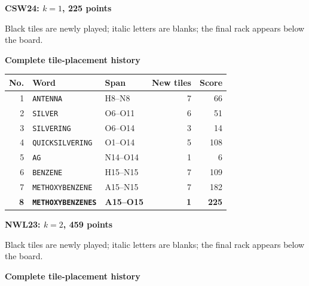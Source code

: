 \documentclass[letterpaper]{article}
\begin{document}
\vfill
\clearpage
\begin{center}
{\fontsize{11}{12}\selectfont\bfseries CSW24: $k=1$, 225 points\par}
\vspace{2pt}
\par
\vspace{1pt}
{\fontsize{7.2}{8}\selectfont Black tiles are newly played; italic letters are blanks; the final rack appears below the board.\par}
\vspace{2pt}
{\fontsize{8.5}{9}\selectfont\bfseries Complete tile-placement history\par}
\end{center}
\begin{center}
\fontsize{8.5}{8.8}\selectfont
\setlength{\tabcolsep}{4pt}
\renewcommand{\arraystretch}{0.90}
\begin{tabular}{@{}rllrr@{}}\toprule
No. & Word & Span & New tiles & Score\\
\midrule
1 & \texttt{ANTENNA} & H8--N8 & 7 & 66\\
2 & \texttt{SILVER} & O6--O11 & 6 & 51\\
3 & \texttt{SILVERING} & O6--O14 & 3 & 14\\
4 & \texttt{QUICKSILVERING} & O1--O14 & 5 & 108\\
5 & \texttt{AG} & N14--O14 & 1 & 6\\
6 & \texttt{BENZENE} & H15--N15 & 7 & 109\\
7 & \texttt{METHOXYBENZENE} & A15--N15 & 7 & 182\\
\midrule
\textbf{8} & \textbf{\texttt{METHOXYBENZENES}} & \textbf{A15--O15} & \textbf{1} & \textbf{225}\\
\bottomrule\end{tabular}
\end{center}
\vfill
\clearpage
\begin{center}
{\fontsize{11}{12}\selectfont\bfseries NWL23: $k=2$, 459 points\par}
\vspace{2pt}
\par
\vspace{1pt}
{\fontsize{7.2}{8}\selectfont Black tiles are newly played; italic letters are blanks; the final rack appears below the board.\par}
\vspace{2pt}
{\fontsize{8.5}{9}\selectfont\bfseries Complete tile-placement history\par}
\end{center}
\end{document}
